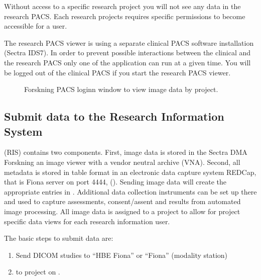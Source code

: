 \documentclass[letterpaper,10pt,english]{sphinxmanual}
\begin{document}
\sphinxAtStartPar
Without access to a specific research project you will not see any data in the research PACS. Each research projects requires specific permissions to become accessible for a user.

\sphinxAtStartPar
The research PACS viewer is using a separate clinical PACS software installation (Sectra IDS7). In order to prevent possible interactions between the clinical and the research PACS only one of the application can run at a given time. You will be logged out of the clinical PACS if you start the research PACS viewer.

\begin{figure}[htbp]
\centering
\capstart

\noindent{}
\caption{Forskning PACS log\sphinxhyphen{}inn window to view image data by project.}\label{\detokenize{EndUser/index:id2}}\end{figure}


\subsection{Submit data to the Research Information System}
\label{\detokenize{EndUser/index:submit-data-to-the-research-information-system}}
\sphinxAtStartPar
{} (RIS) contains two components. First, image data is stored in the Sectra DMA Forskning \sphinxhyphen{} an image viewer with a vendor neutral archive (VNA). Second, all meta\sphinxhyphen{}data is stored in table format in an electronic data capture system REDCap, that is Fiona server on port 4444, (). Sending image data will create the appropriate entries in . Additional data collection instruments can be set up there and used to capture assessments, consent/assent and results from automated image processing. All image data is assigned to a project to allow for project specific data views for each research information user.

\sphinxAtStartPar
The basic steps to submit data are:
\begin{enumerate}
%
\item {} 
\sphinxAtStartPar
Send DICOM studies to “HBE Fiona” or “Fiona” (modality station)

\item {} 
\sphinxAtStartPar
{} to project on .

\end{enumerate}
\end{document}
